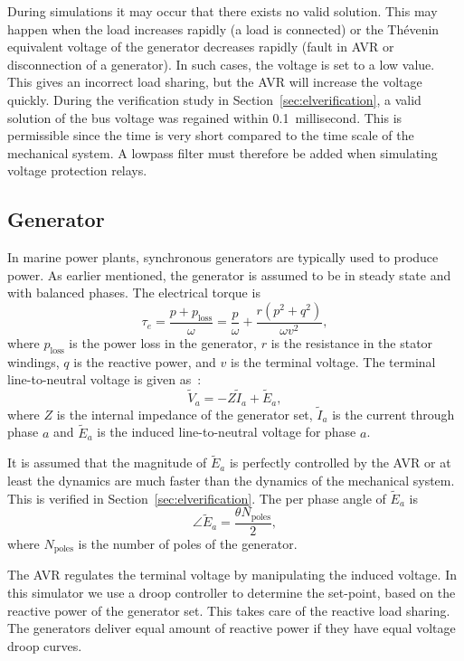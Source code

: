 \documentclass[journal]{IEEEtran}
\begin{document}
During simulations it may occur that there exists no valid solution. This may happen when the load increases rapidly (a load is connected) or the Th\'{e}venin equivalent voltage of the generator decreases rapidly (fault in AVR or disconnection of a generator).
In such cases, the voltage is set to a low value.
This gives an incorrect load sharing, but the AVR will increase the voltage quickly.
During the verification study in Section~\ref{sec:elverification}, a valid solution of the bus voltage was regained within 0.1~millisecond.
This is permissible since the time is very short compared to the time scale of the mechanical system.
A lowpass filter must therefore be added when simulating voltage protection relays.

\subsection{Generator}
\label{sec:Generator}
In marine power plants, synchronous generators are typically used to produce power.
As earlier mentioned, the generator is assumed to be in steady state and with balanced phases.
The electrical torque is 
\begin{equation}
\tau_{e} = \dfrac{p+p_\mathrm{loss}}{\omega} = \dfrac{p}{\omega}+\dfrac{r(p^2+q^2)}{\omega v^2},
\end{equation}
where $p_\mathrm{loss}$ is the power loss in the generator, $r$ is the resistance in the stator windings, $q$ is the reactive power, and $v$ is the terminal voltage.
The terminal line-to-neutral voltage is given as~\cite{Krause2013}:
\begin{equation}
\tilde{V}_a=-Z \tilde{I}_a+\tilde{E}_a,
\end{equation}
where $Z$ is the internal impedance of the generator set, $\tilde{I}_a$ is the current through phase $a$ and $\tilde{E}_a$ is the induced line-to-neutral voltage for phase $a$.

It is assumed that the magnitude of $\tilde{E}_a$ is perfectly controlled by the AVR or at least the dynamics are much faster than the dynamics of the mechanical system.
This is verified in Section~\ref{sec:elverification}.
The per phase angle of $\tilde{E}_a$ is
\begin{equation}
\angle{\tilde{E}_a} = \frac{\theta N_\mathrm{poles}}{2},
\end{equation}
where $N_\mathrm{poles}$ is the number of poles of the generator.

The AVR regulates the terminal voltage by manipulating the induced voltage.
In this simulator we use a droop controller to determine the set-point, based on the reactive power of the generator set.
This takes care of the reactive load sharing. 
The generators deliver equal amount of reactive power if they have equal voltage droop curves.
\end{document}
